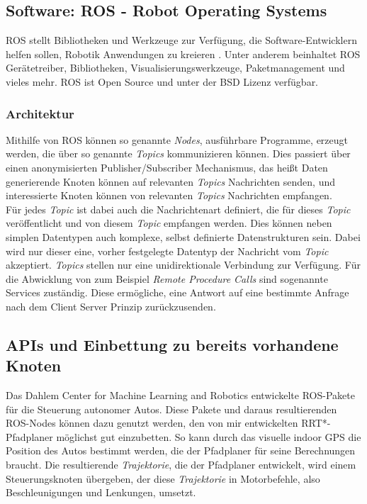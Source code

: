 \subsection{Software: ROS - Robot Operating Systems}
ROS stellt Bibliotheken und Werkzeuge zur Verfügung, die Software-Entwicklern helfen sollen, Robotik Anwendungen zu kreieren \citep{ROS}. Unter anderem beinhaltet ROS Gerätetreiber, Bibliotheken, Visualisierungswerkzeuge, Paketmanagement und vieles mehr. ROS ist Open Source und unter der BSD Lizenz verfügbar.
\subsubsection{Architektur}
Mithilfe von ROS können so genannte \textit{Nodes}, ausführbare Programme, erzeugt werden, die über so genannte \textit{Topics} kommunizieren können. Dies passiert über einen anonymisierten Publisher/Subscriber Mechanismus, das heißt Daten generierende Knoten können auf relevanten \textit{Topics} Nachrichten senden, und interessierte Knoten können von relevanten \textit{Topics} Nachrichten empfangen. \\
Für jedes \textit{Topic} ist dabei auch die Nachrichtenart definiert, die für dieses \textit{Topic} veröffentlicht und von diesem \textit{Topic} empfangen werden. Dies können neben simplen Datentypen auch komplexe, selbst definierte Datenstrukturen sein. Dabei wird nur dieser eine, vorher festgelegte Datentyp der Nachricht vom \textit{Topic} akzeptiert.
\textit{Topics} stellen nur eine unidirektionale Verbindung zur Verfügung. Für die Abwicklung von zum Beispiel \textit{Remote Procedure Calls} sind sogenannte Services zuständig. Diese ermögliche, eine Antwort auf eine bestimmte Anfrage nach dem Client Server Prinzip zurückzusenden.
\subsection{APIs und Einbettung zu bereits vorhandene Knoten}
Das Dahlem Center for Machine Learning and Robotics entwickelte ROS-Pakete für die Steuerung autonomer Autos. Diese Pakete und daraus resultierenden ROS-Nodes können dazu genutzt werden, den von mir entwickelten RRT*-Pfadplaner möglichst gut einzubetten. So kann durch das visuelle indoor GPS die Position des Autos bestimmt werden, die der Pfadplaner für seine Berechnungen braucht. Die resultierende \textit{Trajektorie}, die der Pfadplaner entwickelt, wird einem Steuerungsknoten übergeben, der diese \textit{Trajektorie} in Motorbefehle, also Beschleunigungen und Lenkungen, umsetzt. 
